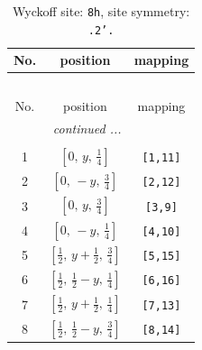 \documentclass[fleqn,8pt]{jsarticle}
\begin{document}
\begin{longtable}{ccc}
\caption{Wyckoff site: {\tt 8h}, site symmetry: {\tt .2'.}}
 \\
 \hline \hline
No. & position & mapping \\ \hline \endfirsthead

\multicolumn{2}{l}{\tablename\ \thetable{}} \\
 \hline \hline
No. & position & mapping \\ \hline \endhead

 \hline \hline
\multicolumn{2}{r}{\footnotesize\it continued ...} \\ \endfoot

 \hline \hline
\multicolumn{2}{r}{} \\ \endlastfoot

1 & $\left[ 0,\, y,\, \frac{1}{4} \right]$ & {\tt [1,11]} \\ \hline
2 & $\left[ 0,\, - y,\, \frac{3}{4} \right]$ & {\tt [2,12]} \\ \hline
3 & $\left[ 0,\, y,\, \frac{3}{4} \right]$ & {\tt [3,9]} \\ \hline
4 & $\left[ 0,\, - y,\, \frac{1}{4} \right]$ & {\tt [4,10]} \\ \hline
5 & $\left[ \frac{1}{2},\, y + \frac{1}{2},\, \frac{3}{4} \right]$ & {\tt [5,15]} \\ \hline
6 & $\left[ \frac{1}{2},\, \frac{1}{2} - y,\, \frac{1}{4} \right]$ & {\tt [6,16]} \\ \hline
7 & $\left[ \frac{1}{2},\, y + \frac{1}{2},\, \frac{1}{4} \right]$ & {\tt [7,13]} \\ \hline
8 & $\left[ \frac{1}{2},\, \frac{1}{2} - y,\, \frac{3}{4} \right]$ & {\tt [8,14]} \\
\end{longtable}
\renewcommand{\arraystretch}{1.2}
\end{document}
